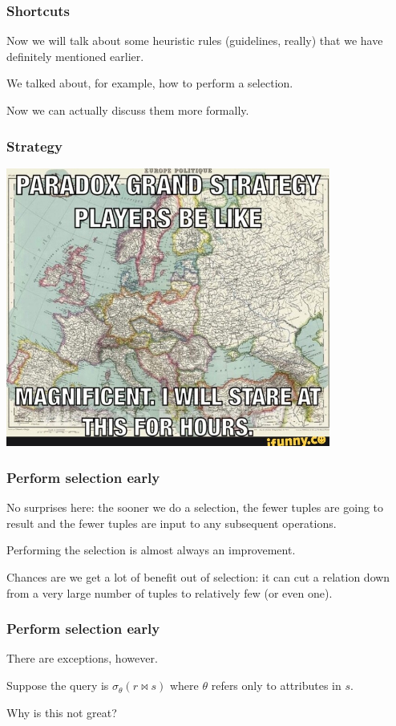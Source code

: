 \begin{frame}
\frametitle{Shortcuts}

Now we will talk about some heuristic rules (guidelines, really) that we have definitely mentioned earlier.

We talked about, for example, how to perform a selection. 

Now we can actually discuss them more formally.

\end{frame}

\begin{frame}
\frametitle{Strategy}

\begin{center}
	\includegraphics[width=0.8\textwidth]{images/strategy.jpg}
\end{center}

\end{frame}

\begin{frame}
\frametitle{Perform selection early}

No surprises here: the sooner we do a selection, the fewer tuples are going to result and the fewer tuples are input to any subsequent operations. 

Performing the selection is almost always an improvement. 

Chances are we get a lot of benefit out of selection: it can cut a relation down from a very large number of tuples to relatively few (or even one). 


\end{frame}

\begin{frame}
\frametitle{Perform selection early}

There are exceptions, however.

Suppose the query is $\sigma_{\theta}( r \bowtie s )$ where $\theta$ refers only to attributes in $s$. 

Why is this not great?

\end{frame}

